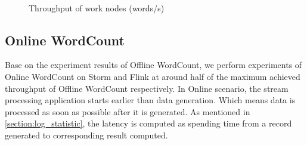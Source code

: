 \begin{figure}[t!]
\begin{center}
  ~
  ~

   \caption{Throughput of work nodes (words/s)}
   \label{fig:worknodes_throughput}
  \end{center}
\end{figure}

\subsection{Online WordCount}
\label{subsec:online_wordcount}

Base on the experiment results of Offline WordCount, we perform experiments of Online WordCount on Storm and Flink at around half of the maximum achieved throughput of Offline WordCount respectively. In Online scenario, the stream processing application starts earlier than data generation. Which means data is processed as soon as possible after it is generated. As mentioned in \cref{section:log_statistic}, the latency is computed as spending time from a record generated to corresponding result computed.

